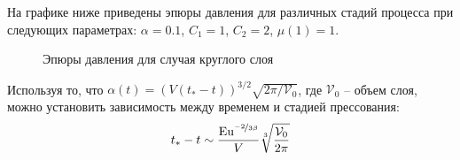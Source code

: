 На графике ниже приведены эпюры давления для различных стадий процесса при следующих параметрах: $\alpha=0.1$, $C_1=1$, $C_2=2$, $\mu(1)=1$.
\begin{figure}[ht]
    \caption{Эпюры давления для случая круглого слоя}
    \label{fig:ch1/pressure}
\end{figure}

Используя то, что $\alpha(t) = \left(V \left(t_*-t\right)\right)^{3/2} \sqrt{2\pi / \mathcal{V}_0}$, где $\mathcal{V}_0$ -- объем слоя, можно установить зависимость между временем и стадией прессования:
\begin{equation}
  t_* - t \sim \frac{\text{Eu}^{\nicefrac{-2}{3\beta}}}{V}\sqrt[3]{\frac{\mathcal{V}_0}{2\pi}}
\end{equation}
